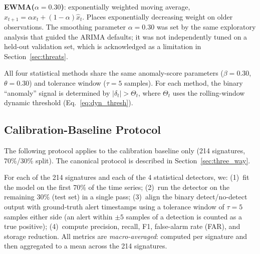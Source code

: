 \documentclass[pdflatex,sn-nature]{sn-jnl}
\theoremstyle{thmstyleone}%
\begin{document}
\textbf{EWMA($\alpha=0.30$)}: exponentially weighted moving average,
$\hat{x}_{t+1} = \alpha x_t + (1-\alpha)\hat{x}_t$.
Places exponentially decreasing weight on older observations.
The smoothing parameter $\alpha=0.30$ was set by the same exploratory
analysis that guided the ARIMA defaults; it was not independently tuned
on a held-out validation set, which is acknowledged as a limitation
in Section~\ref{sec:threats}.

All four statistical methods share the same anomaly-score parameters
($\beta = 0.30$, $\theta = 0.30$) and tolerance window ($\tau = 5$ samples).
For each method, the binary ``anomaly'' signal is determined by
$|\delta_t| > \Theta_t$, where $\Theta_t$ uses the rolling-window dynamic
threshold (Eq.~\ref{eq:dyn_thresh}).

\subsection{Calibration-Baseline Protocol}\label{sec:largescale:protocol}

The following protocol applies to the calibration baseline only (214
signatures, 70\%/30\% split).  The canonical protocol is described in
Section~\ref{sec:three_way}.

For each of the 214 signatures and each of the 4 statistical detectors, we:
(1)~fit the model on the first 70\% of the time series;
(2)~run the detector on the remaining 30\% (test set) in a single pass;
(3)~align the binary detect/no-detect output with ground-truth alert
timestamps using a tolerance window of $\tau = 5$ samples either side
(an alert within $\pm5$ samples of a detection is counted as a true positive);
(4)~compute precision, recall, F1, false-alarm rate (FAR), and storage reduction.
All metrics are \emph{macro-averaged}: computed per signature and then
aggregated to a mean across the 214 signatures.
\end{document}
